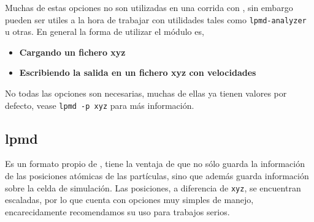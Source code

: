 
Muchas de estas opciones no son utilizadas en una corrida con {\lpmd}, sin embargo pueden ser utiles a la hora de trabajar con utilidades tales como \verb|lpmd-analyzer| u otras. En general la forma de utilizar el m\'odulo es,

\begin{itemize}
 \item \textbf{Cargando un fichero xyz}
 \item \textbf{Escribiendo la salida en un fichero xyz con velocidades}
\end{itemize}

No todas las opciones son necesarias, muchas de ellas ya tienen valores por defecto, vease \verb|lpmd -p xyz| para m\'as informaci\'on.

\subsection{lpmd}

Es un formato propio de {\lpmd}, tiene la ventaja de que no s\'olo guarda la informaci\'on de las posiciones at\'omicas de las part\'iculas, sino que adem\'as guarda informaci\'on sobre la celda de simulaci\'on. Las posiciones, a diferencia de \verb|xyz|, se encuentran escaladas, por lo que cuenta con opciones muy simples de manejo, encarecidamente recomendamos su uso para trabajos serios.

